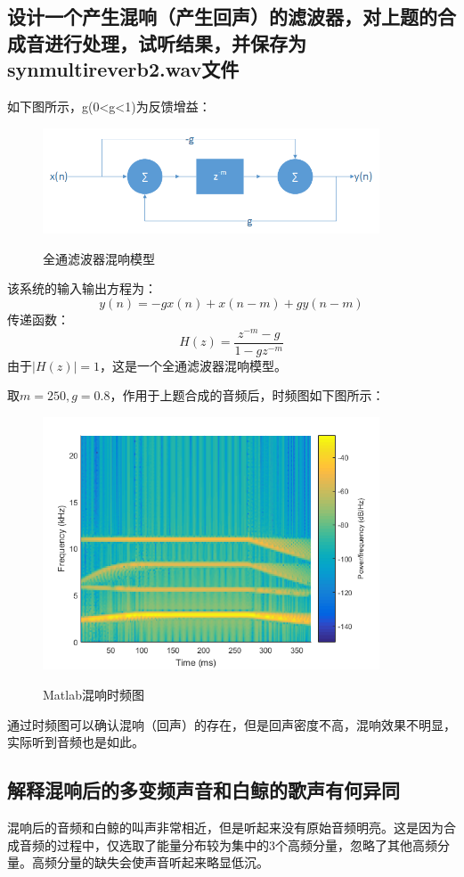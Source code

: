 \documentclass{article}
\begin{document}
        \subsection{设计一个产生混响（产生回声）的滤波器，对上题的合成音进行处理，试听结果，并保存为synmultireverb2.wav文件}
            如下图所示，g(0<g<1)为反馈增益：
            \begin{figure}[htb]
                \centering
                \includegraphics[width=10cm]{figure16.png}
                \label{fig:reverb2-1}\caption{全通滤波器混响模型}
            \end{figure}

            该系统的输入输出方程为：
            $$y(n)=-gx(n)+x(n-m)+gy(n-m)$$
            传递函数：
            $$H(z)=\frac{z^{-m}-g}{1-gz^{-m}}$$
            由于$|H(z)|=1$，这是一个全通滤波器混响模型。

            取$m=250, g=0.8$，作用于上题合成的音频后，时频图如下图所示：
            \begin{figure}[H]
                \centering
                \includegraphics[width=10cm]{figure17.png}
                \label{fig:reverb2-2}\caption{Matlab混响时频图}
            \end{figure}

            通过时频图可以确认混响（回声）的存在，但是回声密度不高，混响效果不明显，实际听到音频也是如此。

        \subsection{解释混响后的多变频声音和白鲸的歌声有何异同}
            混响后的音频和白鲸的叫声非常相近，但是听起来没有原始音频明亮。这是因为合成音频的过程中，仅选取了能量分布较为集中的3个高频分量，忽略了其他高频分量。高频分量的缺失会使声音听起来略显低沉。
\end{document}
